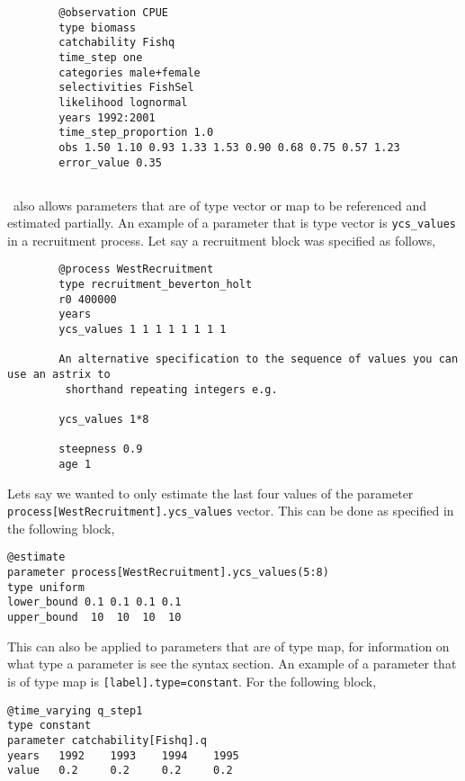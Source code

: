 {\small{\begin{verbatim}
		@observation CPUE
		type biomass
		catchability Fishq
		time_step one
		categories male+female
		selectivities FishSel
		likelihood lognormal
		years 1992:2001
		time_step_proportion 1.0
		obs 1.50 1.10 0.93 1.33 1.53 0.90 0.68 0.75 0.57 1.23
		error_value 0.35
\end{verbatim}}}



\subsection{\label{sec:params}}
\CNAME\ also allows parameters that are of type vector or map to be referenced and estimated partially. An example of a parameter that is type vector is \texttt{ycs\_values} in a recruitment process. Let say a recruitment block was specified as follows,
{\small{\begin{verbatim}
		@process WestRecruitment
		type recruitment_beverton_holt
		r0 400000
		years
		ycs_values 1 1 1 1 1 1 1 1 
		
		An alternative specification to the sequence of values you can use an astrix to
		 shorthand repeating integers e.g.
				
		ycs_values 1*8
				
		steepness 0.9
		age 1
\end{verbatim}}}

Lets say we wanted to only estimate the last four values of the parameter \texttt{process[WestRecruitment].ycs\_values} vector. This can be done as specified in the following  block,

{\small{\begin{verbatim}
@estimate
parameter process[WestRecruitment].ycs_values(5:8)
type uniform
lower_bound 0.1 0.1 0.1 0.1
upper_bound  10  10  10  10 
\end{verbatim}}}

This can also be applied to parameters that are of type map, for information on what type a parameter is see the syntax section. An example of a parameter that is of type map is \texttt{[label].type=constant}. For the following  block,

{\small{\begin{verbatim}
@time_varying q_step1
type constant
parameter catchability[Fishq].q
years 	1992	1993	1994	1995
value 	0.2		0.2		0.2		0.2	
\end{verbatim}}}

